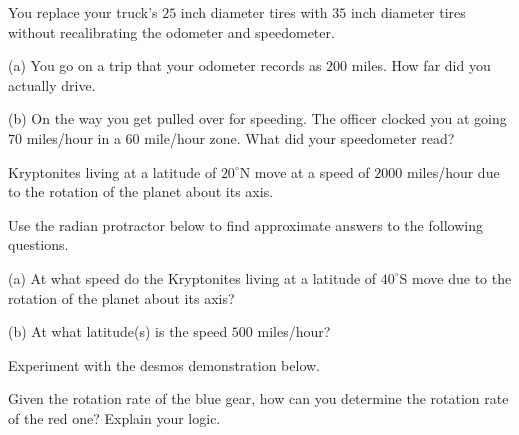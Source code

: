 \documentclass{ximera}
\begin{document}
\begin{question}  \label{Q6521:Angles}
You replace  your truck's $25$ inch diameter tires with $35$ inch diameter tires without recalibrating the odometer and speedometer.

(a) You go on a trip that your odometer records as $200$ miles. How far did you actually drive.

(b) On the way you get pulled over for speeding. The officer clocked you at going $70$ miles/hour in a $60$ mile/hour zone. What did your speedometer read?
\end{question}


\begin{question} \label{Q6721:Angles}
Kryptonites living at a latitude of $20^\circ$N move at a speed of $2000$ miles/hour due to the rotation of the planet about its axis.

Use the radian protractor below to find approximate answers to the following questions.

(a) At what speed do the Kryptonites living at a latitude of $40^\circ$S move due to the rotation of the planet about its axis?

(b) At what latitude(s) is the speed $500$ miles/hour?

\begin{exploration}
 
\begin{onlineOnly}
    \begin{center}
\end{center}
\end{onlineOnly}
\end{exploration}

\end{question}



\begin{question}  \label{Q3242:Angles}
Experiment with the desmos demonstration below. 

Given the rotation rate of the blue gear, how can you determine the rotation rate of the red one? Explain your logic.

 
\begin{onlineOnly}
    \begin{center}
\end{center}
\end{onlineOnly}
\end{question}
\end{document}
